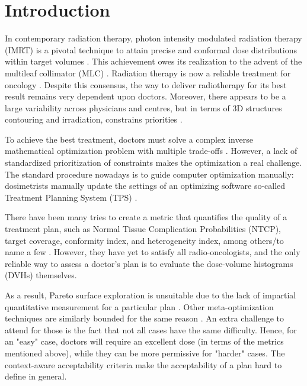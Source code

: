 \section{Introduction}
In contemporary radiation therapy, photon intensity modulated radiation therapy (IMRT) is a pivotal technique to attain precise and conformal dose distributions within target volumes \cite{xu_comparison_2017}.
This achievement owes its realization to the advent of the multileaf collimator (MLC) \cite{galvin_characterization_1993}.
Radiation therapy is now a reliable treatment for oncology \cite{valentini_survival_2009}.
Despite this consensus, the way to deliver radiotherapy for its best result remains very dependent upon doctors.
Moreover, there appears to be a large variability across physicians and centres, but in terms of 3D structures contouring and irradiation, constrains priorities \cite{variability_2021}.

To achieve the best treatment, doctors must solve a complex inverse mathematical optimization problem with multiple trade-offs \cite{oelfke_inverse_2001} \cite{webb_physical_2003}.
However, a lack of standardized prioritization of constraints makes the optimization a real challenge.
The standard procedure nowadays is to guide computer optimization manually: dosimetrists manually update the settings of an optimizing software so-called Treatment Planning System (TPS) \cite{planification_website}.

There have been many tries to create a metric that quantifies the quality of a treatment plan, such as Normal Tissue Complication Probabilities (NTCP), target coverage, conformity index, and heterogeneity index, among others/to name a few \cite{lyman_normal_1992} \cite{li_input_2022}\label{metrics}.
However, they have yet to satisfy all radio-oncologists, and the only reliable way to assess a doctor's plan is to evaluate the dose-volume histograms (DVHs) themselves.

As a result, Pareto surface exploration is unsuitable due to the lack of impartial quantitative measurement for a particular plan \cite{huang_pareto_2021}.
Other meta-optimization techniques are similarly bounded for the same reason \cite{wu_optimization_2001} \cite{xing_optimization_1999}.
An extra challenge to attend for those is the fact that not all cases have the same difficulty.
Hence, for an "easy" case, doctors will require an excellent dose (in terms of the metrics mentioned above), while they can be more permissive for "harder" cases.
The context-aware acceptability criteria make the acceptability of a plan hard to define in general.

